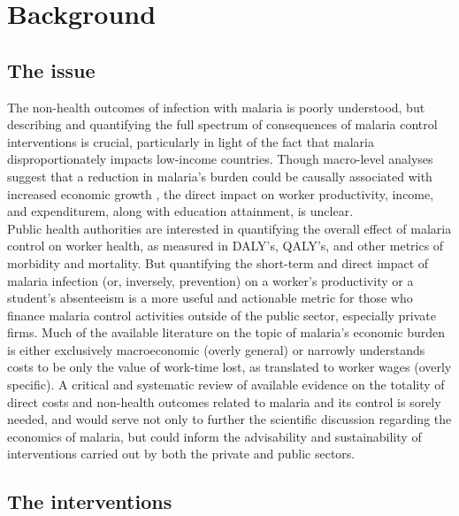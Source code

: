 \documentclass{article}
\begin{document}
\vfill  


\section*{Background}

\subsection*{The issue}


The non-health outcomes of infection with malaria is poorly understood, but describing and quantifying the full spectrum of consequences of malaria control interventions is crucial, particularly in light of the fact that malaria disproportionately impacts low-income countries. Though macro-level analyses suggest that a reduction in malaria's burden could be causally associated with increased economic growth \cite{Sachs2002}, the direct impact on worker productivity, income, and expenditurem, along with education attainment, is unclear. \\


\noindent Public health authorities are interested in quantifying the overall effect of malaria control on worker health, as measured in DALY's, QALY's, and other metrics of morbidity and mortality. But quantifying the short-term and direct impact of malaria infection (or, inversely, prevention) on a worker's productivity or a student's absenteeism is a more useful and actionable metric for those who finance malaria control activities outside of the public sector, especially private firms. Much of the available literature on the topic of malaria's economic burden is either exclusively macroeconomic (overly general) \cite{Bloom2004} or narrowly understands costs to be only the value of work-time lost, as translated to worker wages (overly specific)\cite{Chima2003}. A critical and systematic review of available evidence on the totality of direct costs and non-health outcomes related to malaria and its control is sorely needed, and would serve not only to further the scientific discussion regarding the economics of malaria, but could inform the advisability and sustainability of interventions carried out by both the private and public sectors. 

\subsection*{The interventions}
\end{document}
